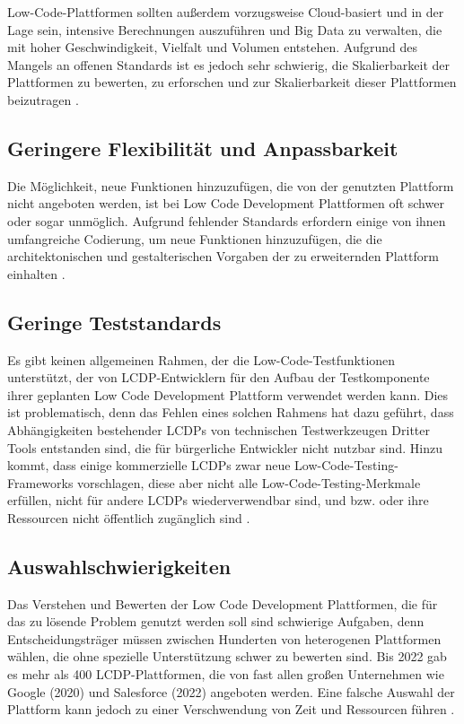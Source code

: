 \documentclass[12pt]{article} %
\begin{document}
	Low-Code-Plattformen sollten außerdem vorzugsweise Cloud-basiert und in der Lage sein, intensive Berechnungen auszuführen und Big Data zu verwalten, die mit hoher Geschwindigkeit, Vielfalt und Volumen entstehen. Aufgrund des Mangels an offenen Standards ist es jedoch sehr schwierig, die Skalierbarkeit der Plattformen zu bewerten, zu erforschen und zur Skalierbarkeit dieser Plattformen beizutragen \autocite{Alamin.2023}.
	
	\subsection{Geringere Flexibilität und Anpassbarkeit}	
	Die Möglichkeit, neue Funktionen hinzuzufügen, die von der genutzten Plattform nicht angeboten werden, ist bei Low Code Development Plattformen oft schwer oder sogar unmöglich. Aufgrund fehlender Standards erfordern einige von ihnen umfangreiche Codierung, um neue Funktionen hinzuzufügen, die die architektonischen und gestalterischen Vorgaben der zu erweiternden Plattform einhalten \autocite{Alamin.2023}.
	
	\subsection{Geringe Teststandards} 
	Es gibt keinen allgemeinen Rahmen, der die Low-Code-Testfunktionen unterstützt, der von LCDP-Entwicklern für den Aufbau der Testkomponente ihrer geplanten Low Code Development Plattform verwendet werden kann. Dies ist problematisch, denn das Fehlen eines solchen Rahmens hat dazu geführt, dass Abhängigkeiten bestehender LCDPs von technischen Testwerkzeugen Dritter Tools entstanden sind, die für bürgerliche Entwickler nicht nutzbar sind. Hinzu kommt, dass einige kommerzielle LCDPs zwar neue Low-Code-Testing-Frameworks vorschlagen, diese aber nicht alle  Low-Code-Testing-Merkmale erfüllen, nicht für andere LCDPs wiederverwendbar sind, und bzw. oder ihre Ressourcen nicht öffentlich zugänglich sind \autocite{Khorram.2020}.	
	
	\subsection{Auswahlschwierigkeiten}	
	Das Verstehen und Bewerten der Low Code Development Plattformen, die für das zu lösende Problem genutzt werden soll sind schwierige Aufgaben, denn  Entscheidungsträger müssen zwischen Hunderten von heterogenen Plattformen wählen, die ohne spezielle Unterstützung schwer zu bewerten sind. Bis 2022 gab es mehr als 400 LCDP-Plattformen, die von fast allen großen Unternehmen wie Google (2020) und Salesforce (2022) angeboten werden. Eine falsche Auswahl der Plattform kann jedoch zu einer Verschwendung von Zeit und Ressourcen führen \autocite{Alamin.2023}. 
	
\end{document}
